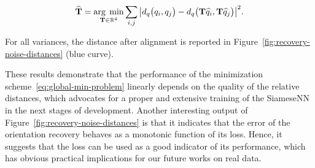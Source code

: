 \begin{equation}
    \label{eq:alignement}
    \widehat{\mathbf{T}}=\underset{\mathbf{T}\in\mathbb{R}^4}{\arg\;\min}\sum_{i,j} \big|d_q\big(q_i,q_j\big)- d_q\big(\mathbf{T}\widehat{q}_i,\mathbf{T}\widehat{q}_j\big)\big|^2.
\end{equation}

For all variances, the distance after alignment is reported in Figure~\ref{fig:recovery-noise-distances} (blue curve).

These results demonstrate that the performance of the minimization scheme~\eqref{eq:global-min-problem} linearly depends on the quality of the relative distances, which advocates for a proper and extensive training of the SiameseNN in the next stages of development. Another interesting output of Figure~\ref{fig:recovery-noise-distances} is that it indicates that the error of the orientation recovery behaves as a monotonic function of its loss. Hence, it suggests that the loss can be used as a good indicator of its performance, which has obvious practical implications for our future works on real data.
